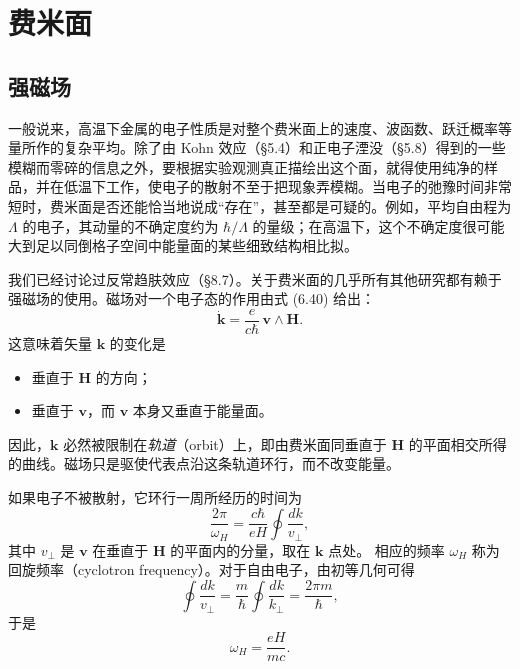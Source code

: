 \chapter{费米面}


\section{强磁场}

一般说来，高温下金属的电子性质是对整个费米面上的速度、波函数、跃迁概率等量所作的复杂平均。除了由 Kohn 效应（§5.4）和正电子湮没（§5.8）得到的一些模糊而零碎的信息之外，要根据实验观测真正描绘出这个面，就得使用纯净的样品，并在低温下工作，使电子的散射不至于把现象弄模糊。当电子的弛豫时间非常短时，费米面是否还能恰当地说成“存在”，甚至都是可疑的。例如，平均自由程为 $\Lambda$ 的电子，其动量的不确定度约为 $\hbar/\Lambda$ 的量级；在高温下，这个不确定度很可能大到足以同倒格子空间中能量面的某些细致结构相比拟。

我们已经讨论过反常趋肤效应（§8.7）。关于费米面的几乎所有其他研究都有赖于强磁场的使用。磁场对一个电子态的作用由式 (6.40) 给出：
\begin{equation*}
\dot{\mathbf{k}}=\frac{e}{c\hbar}\,\mathbf{v}\wedge\mathbf{H}. \tag{9.1}
\end{equation*}
这意味着矢量 $\mathbf{k}$ 的变化是
\begin{itemize}
\item[(i)] 垂直于 $\mathbf{H}$ 的方向；
\item[(ii)] 垂直于 $\mathbf{v}$，而 $\mathbf{v}$ 本身又垂直于能量面。
\end{itemize}
因此，$\mathbf{k}$ 必然被限制在\emph{轨道}（orbit）上，即由费米面同垂直于 $\mathbf{H}$ 的平面相交所得的曲线。磁场只是驱使代表点沿这条轨道环行，而不改变能量。

如果电子不被散射，它环行一周所经历的时间为
\begin{equation*}
\frac{2\pi}{\omega_H}=\frac{c\hbar}{eH}\oint\frac{dk}{v_{\perp}}, \tag{9.2}
\end{equation*}
其中 $v_{\perp}$ 是 $\mathbf{v}$ 在垂直于 $\mathbf{H}$ 的平面内的分量，取在 $\mathbf{k}$ 点处。
相应的频率 $\omega_H$ 称为回旋频率（cyclotron frequency）。对于自由电子，由初等几何可得
\begin{equation*}
\oint\frac{dk}{v_{\perp}}=\frac{m}{\hbar}\oint\frac{dk}{k_{\perp}}=\frac{2\pi m}{\hbar}, \tag{9.3}
\end{equation*}
于是
\begin{equation*}
\omega_H=\frac{eH}{mc}. \tag{9.4}
\end{equation*}

